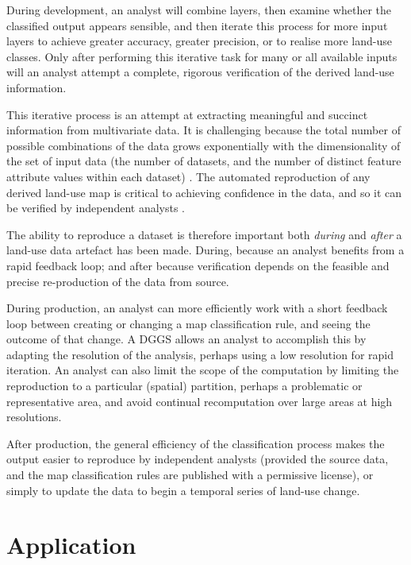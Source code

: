 \documentclass[]{interact}
\theoremstyle{plain}%
\theoremstyle{definition}
\theoremstyle{remark}
\begin{document}
During development, an analyst will combine layers, then examine whether the classified output appears sensible, and then iterate this process for more input layers to achieve greater accuracy, greater precision, or to realise more land-use classes. Only after performing this iterative task for many or all available inputs will an analyst attempt a complete, rigorous verification of the derived land-use information. 

This iterative process is an attempt at extracting meaningful and succinct information from multivariate data. It is challenging because the total number of possible combinations of the data grows exponentially with the dimensionality of the set of input data (the number of datasets, and the number of distinct feature attribute values within each dataset) \citep{behrisch2014feedback}. The automated reproduction of any derived land-use map is critical to achieving confidence in the data, and so it can be verified by independent analysts \citep{etherington2022,baker2016}.

The ability to reproduce a dataset is therefore important both \textit{during} and \textit{after} a land-use data artefact has been made. During, because an analyst benefits from a rapid feedback loop; and after because verification depends on the feasible and precise re-production of the data from source.

During production, an analyst can more efficiently work with a short feedback loop between creating or changing a map classification rule, and seeing the outcome of that change. A \ac{DGGS} allows an analyst to accomplish this by adapting the resolution of the analysis, perhaps using a low resolution for rapid iteration. An analyst can also limit the scope of the computation by limiting the reproduction to a particular (spatial) partition, perhaps a problematic or representative area, and avoid continual recomputation over large areas at high resolutions.

After production, the general efficiency of the classification process makes the output easier to reproduce by independent analysts (provided the source data, and the map classification rules are published with a permissive license), or simply to update the data to begin a temporal series of land-use change.

\section{Application} %
\end{document}
